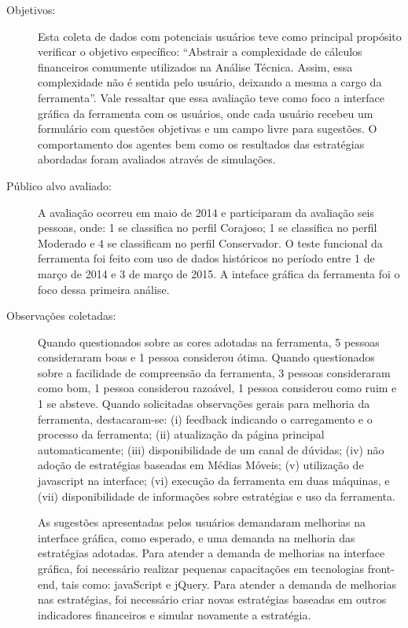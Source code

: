 \begin{description}

\item[Objetivos:]
Esta coleta de dados com potenciais usuários teve como principal propósito verificar o objetivo específico: “Abstrair a complexidade de cálculos financeiros comumente utilizados na Análise Técnica. Assim, essa complexidade não é sentida pelo usuário, deixando a mesma a cargo da ferramenta”. Vale ressaltar que essa avaliação teve como foco a interface gráfica da ferramenta com os usuários, onde cada usuário recebeu um formulário com questões objetivas e um campo livre para sugestões. O comportamento dos agentes bem como os resultados das estratégias abordadas foram avaliados através de simulações.

\item[Público alvo avaliado:]

A avaliação ocorreu em maio de 2014 e participaram da avaliação seis pessoas, onde: 1 se classifica no perfil Corajoso; 1 se classifica no perfil Moderado e 4 se classificam no perfil Conservador. O teste funcional da ferramenta foi feito com uso de dados históricos no período entre 1 de março de 2014 e 3 de março de 2015. A inteface gráfica da ferramenta foi o foco dessa primeira análise.

\item[Observações coletadas:]
Quando questionados sobre as cores adotadas na ferramenta, 5 pessoas consideraram boas e 1 pessoa considerou ótima. Quando questionados sobre a facilidade de compreensão da ferramenta, 3 pessoas consideraram como bom, 1 pessoa considerou razoável, 1 pessoa considerou como ruim e 1 se absteve. Quando solicitadas observações gerais para melhoria da ferramenta, destacaram-se: (i) feedback indicando o carregamento e o processo da ferramenta; (ii) atualização da página principal automaticamente; (iii) disponibilidade de um canal de dúvidas; (iv) não adoção de estratégias baseadas em Médias Móveis; (v) utilização de javascript na interface; (vi) execução da ferramenta em duas máquinas, e (vii) disponibilidade de informações sobre estratégias e uso da ferramenta.

As sugestões apresentadas pelos usuários demandaram melhorias na interface gráfica, como esperado, e uma demanda na melhoria das estratégias adotadas. Para atender a demanda de melhorias na interface gráfica, foi necessário realizar pequenas capacitações em tecnologias front-end, tais como: javaScript e jQuery. Para atender a demanda de melhorias nas estratégias, foi necessário criar novas estratégias baseadas em outros indicadores financeiros e simular novamente a estratégia.


\end{description}
